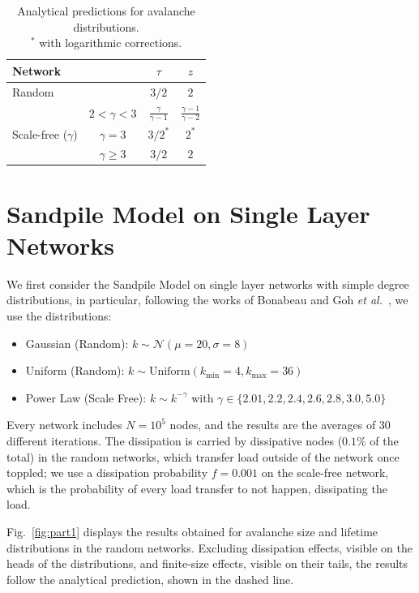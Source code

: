 \begin{table}[htbp]
    \centering
    \begin{tabular}{lc|c|c}
        \toprule
        \textbf{Network} && $\tau$ & $z$ \\
        \midrule
        Random && $3/2$ & $2$ \\
        \hline
        & $2<\gamma<3$ & $\frac{\gamma}{\gamma-1}$ & $\frac{\gamma-1}{\gamma-2}$ \\
        Scale-free ($\gamma$) & $\gamma=3$ & $3/2^*$ & $2^*$\\
        & $\gamma\ge3$ & $3/2$ & $2$\\
        \bottomrule
    \end{tabular}
    \caption{Analytical predictions for avalanche distributions. \\
    $^*$ with logarithmic corrections.}
    \label{tab:analytical_res}
\end{table}

\noindent  

\section{Sandpile Model on Single Layer Networks} 

\noindent We first consider the Sandpile Model on single layer networks with simple degree distributions, in particular, following the works of Bonabeau \cite{doi:10.1143/JPSJ.64.327} and Goh \emph{et al.}~\cite{PhysRevLett.91.148701}, we use the distributions:
\begin{itemize}  
    \item Gaussian (Random): $k \sim \mathcal{N}(\mu=20,\sigma=8)$
    \item Uniform (Random): $k\sim\text{Uniform}(k_{\mathrm{min}}=4,k_{\mathrm{max}}=36)$
    \item Power Law (Scale Free): $k\sim k^{-\gamma}$ with $\gamma\in\{2.01,2.2,2.4,2.6,2.8,3.0,5.0\}$
\end{itemize}

\noindent Every network includes $N=10^5$ nodes, and the results are the averages of $30$ different iterations.
The dissipation is carried by dissipative nodes ($0.1\%$ of the total) in the random networks, which transfer load outside of the network once toppled; we use a dissipation probability $f=0.001$ on the scale-free network, 
which is the probability of every load transfer to not happen, dissipating the load.


\noindent Fig.~\ref{fig:part1} displays the results obtained for avalanche size and lifetime distributions in the random networks. 
Excluding dissipation effects, visible on the heads of the distributions, and finite-size effects, visible on their tails, 
the results follow the analytical prediction, shown in the dashed line.

